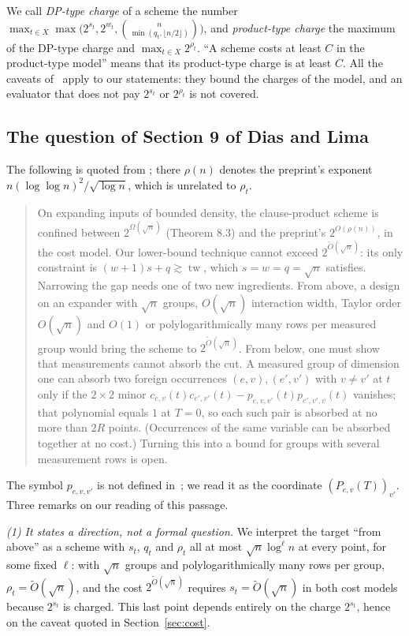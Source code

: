 \documentclass[11pt,a4paper]{article}
\theoremstyle{definition}
\theoremstyle{remark}
\newcommand{\tw}{\operatorname{tw}}
\begin{document}
We call \emph{DP-type charge} of a scheme the number
$\max_{t\in X}\max\bigl(2^{s_t},2^{w_t},\binom{n}{\min(q_t,\lfloor n/2\rfloor)}\bigr)$, and
\emph{product-type charge} the maximum of the DP-type charge and $\max_{t\in X}2^{\rho_t}$.
``A scheme costs at least $C$ in the product-type model'' means that its product-type charge
is at least $C$. All the caveats of~\cite{DL} apply to our statements: they bound the charges
of the model, and an evaluator that does not pay $2^{s_t}$ or $2^{\rho_t}$ is not covered.

\subsection{The question of Section 9 of Dias and Lima}\label{sec:question}

The following is quoted from \cite[Section~9, ``The gap'']{DL}; there $\rho(n)$ denotes the
preprint's exponent $n(\log\log n)^2/\sqrt{\log n}$, which is unrelated to $\rho_t$.

\begin{quote}
On expanding inputs of bounded density, the clause-product scheme is confined between
$2^{\Omega(\sqrt n)}$ (Theorem 8.3) and the preprint's $2^{O(\rho(n))}$, in the cost model.
Our lower-bound technique cannot exceed $2^{\tilde O(\sqrt n)}$: its only constraint is
$(w+1)s+q\gtrsim\tw$, which $s=w=q=\sqrt n$ satisfies. Narrowing the gap needs one of two new
ingredients. From above, a design on an expander with $\sqrt n$ groups, $O(\sqrt n)$
interaction width, Taylor order $O(\sqrt n)$ and $O(1)$ or polylogarithmically many rows per
measured group would bring the scheme to $2^{\tilde O(\sqrt n)}$. From below, one must show
that measurements cannot absorb the cut. A measured group of dimension one can absorb two
foreign occurrences $(e,v),(e',v')$ with $v\ne v'$ at $t$ only if the $2\times2$ minor
$c_{e,v}(t)c_{e',v'}(t)-p_{e,v,v'}(t)p_{e',v',v}(t)$ vanishes; that polynomial equals $1$ at
$T=0$, so each such pair is absorbed at no more than $2R$ points. (Occurrences of the same
variable can be absorbed together at no cost.) Turning this into a bound for groups with
several measurement rows is open.
\end{quote}

The symbol $p_{e,v,v'}$ is not defined in~\cite{DL}; we read it as the coordinate
$(P_{e,v}(T))_{v'}$. Three remarks on our reading of this passage.

\emph{(1) It states a direction, not a formal question.} We interpret the target ``from
above'' as a scheme with $s_t$, $q_t$ and $\rho_t$ all at most $\sqrt n\log^{\ell}n$ at every
point, for some fixed $\ell$: with $\sqrt n$ groups and polylogarithmically many rows per
group, $\rho_t=\tilde O(\sqrt n)$, and the cost $2^{\tilde O(\sqrt n)}$ requires
$s_t=\tilde O(\sqrt n)$ in both cost models because $2^{s_t}$ is charged. This last point
depends entirely on the charge $2^{s_t}$, hence on the caveat quoted in
Section~\ref{sec:cost}.
\end{document}
